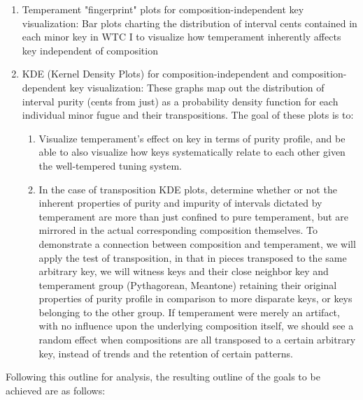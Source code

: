 \begin{enumerate}
\def\labelenumi{\arabic{enumi}.}
\tightlist
\item
  Temperament "fingerprint" plots for composition-independent key
  visualization: Bar plots charting the distribution of interval cents
  contained in each minor key in WTC I to visualize how temperament
  inherently affects key independent of composition
\item
  KDE (Kernel Density Plots) for composition-independent and
  composition-dependent key visualization: These graphs map out the
  distribution of interval purity (cents from just) as a probability
  density function for each individual minor fugue and their
  transpositions. The goal of these plots is to:

  \begin{enumerate}
  \def\labelenumii{\arabic{enumii}.}
  \tightlist
  \item
    Visualize temperament's effect on key in terms of purity profile,
    and be able to also visualize how keys systematically relate to each
    other given the well-tempered tuning system.
  \item
    In the case of transposition KDE plots, determine whether or not the
    inherent properties of purity and impurity of intervals dictated by
    temperament are more than just confined to pure temperament, but are
    mirrored in the actual corresponding composition themselves. To
    demonstrate a connection between composition and temperament, we
    will apply the test of transposition, in that in pieces transposed
    to the same arbitrary key, we will witness keys and their close
    neighbor key and temperament group (Pythagorean, Meantone) retaining
    their original properties of purity profile in comparison to more
    disparate keys, or keys belonging to the other group. If temperament
    were merely an artifact, with no influence upon the underlying
    composition itself, we should see a random effect when compositions
    are all transposed to a certain arbitrary key, instead of trends and
    the retention of certain patterns.
  \end{enumerate}
\end{enumerate}

Following this outline for analysis, the resulting outline of the goals
to be achieved are as follows:

